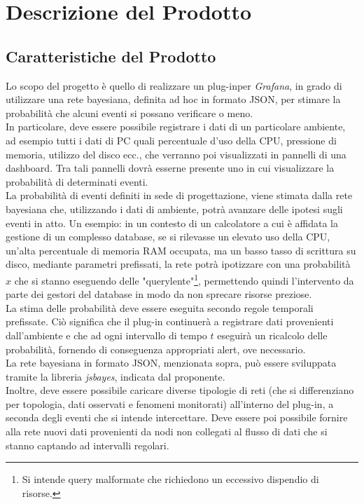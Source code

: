 \section{Descrizione del Prodotto}\label{DescrizioneProdotto}

\subsection{Caratteristiche del Prodotto}\label{CaratteristicheProdotto}
Lo scopo del progetto è quello di realizzare un plug-in\glossario per \textit{Grafana}\glossario, in grado di utilizzare una rete bayesiana\glossario, definita ad hoc in formato JSON\glossario, per stimare la probabilità che alcuni eventi si possano verificare o meno.\\
In particolare, deve essere possibile registrare i dati di un particolare ambiente, ad esempio tutti i dati di PC quali percentuale d'uso della CPU, pressione di memoria, utilizzo del disco ecc., che verranno poi visualizzati in pannelli di una dashboard. Tra tali pannelli dovrà esserne presente uno in cui visualizzare la probabilità di determinati eventi.\\
La probabilità di eventi definiti in sede di progettazione, viene stimata dalla rete bayesiana che, utilizzando i dati di ambiente, potrà avanzare delle ipotesi sugli eventi in atto. Un esempio: in un contesto di un calcolatore a cui è affidata la gestione di un complesso database\glossario, se si rilevasse un elevato uso della CPU, un'alta percentuale di memoria RAM occupata, ma un basso tasso di scrittura su disco, mediante parametri prefissati, la rete potrà ipotizzare con una probabilità $x$ che si stanno eseguendo delle "query\glossario lente"\footnote{Si intende query malformate che richiedono un eccessivo dispendio di risorse.}, permettendo quindi l'intervento da parte dei gestori del database in modo da non sprecare risorse preziose.\\
La stima delle probabilità deve essere eseguita secondo regole temporali prefissate. Ciò significa che il plug-in continuerà a registrare dati provenienti dall'ambiente e che ad ogni intervallo di tempo $t$ eseguirà un ricalcolo delle probabilità, fornendo di conseguenza appropriati alert, ove necessario.\\
La rete bayesiana in formato JSON, menzionata sopra, può essere sviluppata tramite la libreria \textit{jsbayes}\glossario, indicata dal proponente.\\
Inoltre, deve essere possibile caricare diverse tipologie di reti (che si differenziano per topologia, dati osservati e fenomeni monitorati) all'interno del plug-in, a seconda degli eventi che si intende intercettare. Deve essere poi possibile fornire alla rete nuovi dati provenienti da nodi non collegati al flusso di dati che si stanno captando ad intervalli regolari.

